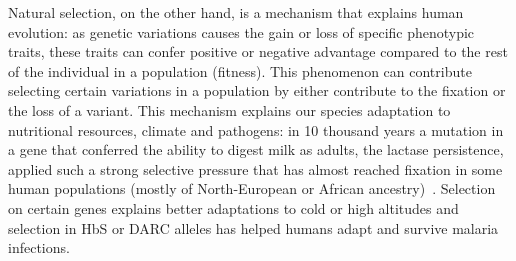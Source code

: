 Natural selection, on the other hand, is a mechanism that explains human evolution: as genetic variations causes the gain or loss of specific phenotypic traits, these traits can confer positive or negative advantage compared to the rest of the individual in a population (fitness). This phenomenon can contribute selecting certain variations in a population by either contribute to the fixation or the loss of a variant. This mechanism explains our species adaptation to nutritional resources, climate and pathogens: in 10 thousand years a mutation in a gene that conferred the ability to digest milk as adults, the lactase persistence, applied such a strong selective pressure that has almost reached fixation in some human populations (mostly of North-European or African ancestry)~\cite{lactase}. Selection on certain genes explains better adaptations to cold or high altitudes and selection in HbS or DARC alleles has helped humans adapt and survive malaria infections\cite{genome_diversity_quintana}. 
